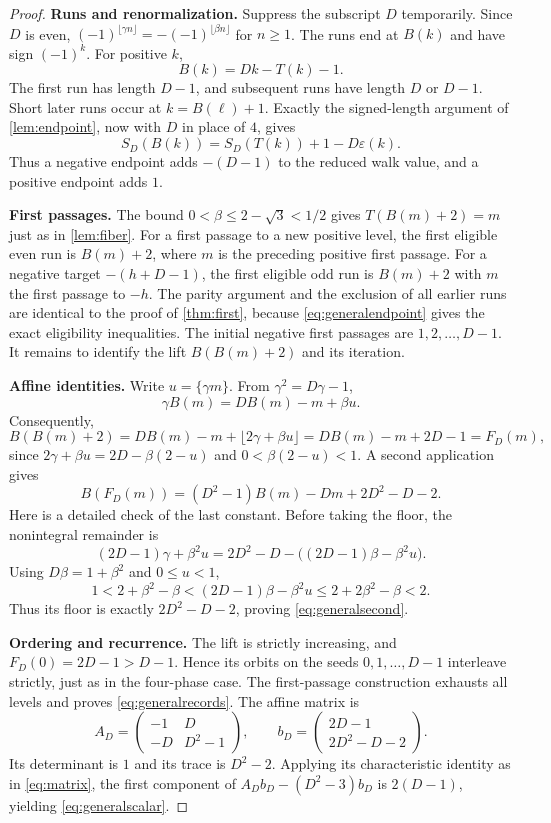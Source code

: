 \documentclass[11pt]{article}
\theoremstyle{definition}
\numberwithin{equation}{section}
\newcommand{\odd}{\varepsilon}
\begin{document}
\begin{proof}
\textbf{Runs and renormalization.}
Suppress the subscript $D$ temporarily. Since $D$ is even,
$(-1)^{\lfloor\gamma n\rfloor}=-(-1)^{\lfloor\beta n\rfloor}$ for $n\ge1$. The runs end at $B(k)$ and have sign $(-1)^k$. For positive $k$,
\[
 B(k)=Dk-T(k)-1.
\]
The first run has length $D-1$, and subsequent runs have length $D$ or $D-1$. Short later runs occur at $k=B(\ell)+1$. Exactly the signed-length argument of \cref{lem:endpoint}, now with $D$ in place of $4$, gives
\begin{equation}\label{eq:generalendpoint}
 S_D(B(k))=S_D(T(k))+1-D\odd(k).
\end{equation}
Thus a negative endpoint adds $-(D-1)$ to the reduced walk value, and a positive endpoint adds $1$.

\textbf{First passages.}
The bound $0<\beta\le2-\sqrt3<1/2$ gives $T(B(m)+2)=m$ just as in \cref{lem:fiber}. For a first passage to a new positive level, the first eligible even run is $B(m)+2$, where $m$ is the preceding positive first passage. For a negative target $-(h+D-1)$, the first eligible odd run is $B(m)+2$ with $m$ the first passage to $-h$. The parity argument and the exclusion of all earlier runs are identical to the proof of \cref{thm:first}, because \eqref{eq:generalendpoint} gives the exact eligibility inequalities. The initial negative first passages are $1,2,\ldots,D-1$.
It remains to identify the lift $B(B(m)+2)$ and its iteration.

\textbf{Affine identities.}
Write $u=\{\gamma m\}$. From $\gamma^2=D\gamma-1$,
\[
 \gamma B(m)=DB(m)-m+\beta u.
\]
Consequently,
\[
 B(B(m)+2)=DB(m)-m+\lfloor2\gamma+\beta u\rfloor
           =DB(m)-m+2D-1=F_D(m),
\]
since $2\gamma+\beta u=2D-\beta(2-u)$ and $0<\beta(2-u)<1$.
A second application gives
\begin{equation}\label{eq:generalsecond}
 B(F_D(m))=(D^2-1)B(m)-Dm+2D^2-D-2.
\end{equation}
Here is a detailed check of the last constant. Before taking the floor, the nonintegral remainder is
\[
 (2D-1)\gamma+\beta^2u
 =2D^2-D-\bigl((2D-1)\beta-\beta^2u\bigr).
\]
Using $D\beta=1+\beta^2$ and $0\le u<1$,
\[
 1<2+\beta^2-\beta
 <(2D-1)\beta-\beta^2u
 \le2+2\beta^2-\beta<2.
\]
Thus its floor is exactly $2D^2-D-2$, proving \eqref{eq:generalsecond}.

\textbf{Ordering and recurrence.}
The lift is strictly increasing, and $F_D(0)=2D-1>D-1$. Hence its orbits on the seeds $0,1,\ldots,D-1$ interleave strictly, just as in the four-phase case. The first-passage construction exhausts all levels and proves \eqref{eq:generalrecords}.
The affine matrix is
\[
 A_D=\begin{pmatrix}-1&D\\-D&D^2-1\end{pmatrix},\qquad
 b_D=\begin{pmatrix}2D-1\\2D^2-D-2\end{pmatrix}.
\]
Its determinant is $1$ and its trace is $D^2-2$. Applying its characteristic identity as in \eqref{eq:matrix}, the first component of
$A_Db_D-(D^2-3)b_D$ is $2(D-1)$, yielding \eqref{eq:generalscalar}.


\end{proof}
\end{document}
